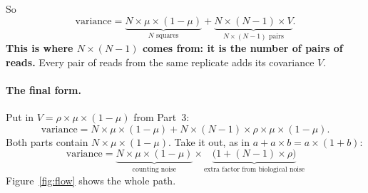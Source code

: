 So
\[
\text{variance} = \underbrace{N \times \mu \times (1-\mu)}_{N \text{ squares}}
 + \underbrace{N \times (N-1) \times V}_{N \times (N-1) \text{ pairs}} .
\]
\textbf{This is where $N \times (N-1)$ comes from: it is the number of pairs
of reads.} Every pair of reads from the same replicate adds its covariance
$V$.

\paragraph{The final form.} Put in $V = \rho \times \mu \times (1-\mu)$ from
Part~3:
\[
\text{variance} = N \times \mu \times (1-\mu)
 + N \times (N-1) \times \rho \times \mu \times (1-\mu).
\]
Both parts contain $N \times \mu \times (1-\mu)$. Take it out, as in
$a + a \times b = a \times (1+b)$:
\[
\boxed{\;\text{variance} = \underbrace{N \times \mu \times (1-\mu)}_{\text{counting noise}}
 \times \underbrace{\bigl(1 + (N-1) \times \rho\bigr)}_{\text{extra factor from biological noise}}\;}
\]
Figure~\ref{fig:flow} shows the whole path.

